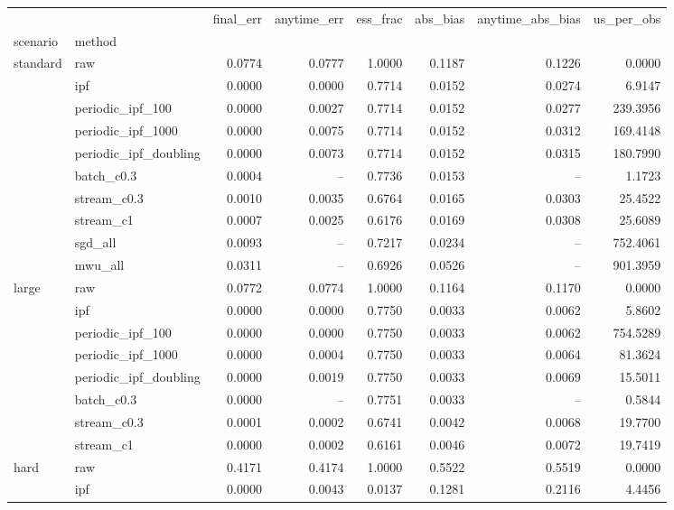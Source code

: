 \begin{tabular}{llrrrrrr}
\toprule
 &  & final\_err & anytime\_err & ess\_frac & abs\_bias & anytime\_abs\_bias & us\_per\_obs \\
scenario & method &  &  &  &  &  &  \\
\midrule
\multirow[t]{10}{*}{standard} & raw & 0.0774 & 0.0777 & 1.0000 & 0.1187 & 0.1226 & 0.0000 \\
 & ipf & 0.0000 & 0.0000 & 0.7714 & 0.0152 & 0.0274 & 6.9147 \\
 & periodic\_ipf\_100 & 0.0000 & 0.0027 & 0.7714 & 0.0152 & 0.0277 & 239.3956 \\
 & periodic\_ipf\_1000 & 0.0000 & 0.0075 & 0.7714 & 0.0152 & 0.0312 & 169.4148 \\
 & periodic\_ipf\_doubling & 0.0000 & 0.0073 & 0.7714 & 0.0152 & 0.0315 & 180.7990 \\
 & batch\_c0.3 & 0.0004 & -- & 0.7736 & 0.0153 & -- & 1.1723 \\
 & stream\_c0.3 & 0.0010 & 0.0035 & 0.6764 & 0.0165 & 0.0303 & 25.4522 \\
 & stream\_c1 & 0.0007 & 0.0025 & 0.6176 & 0.0169 & 0.0308 & 25.6089 \\
 & sgd\_all & 0.0093 & -- & 0.7217 & 0.0234 & -- & 752.4061 \\
 & mwu\_all & 0.0311 & -- & 0.6926 & 0.0526 & -- & 901.3959 \\
\cline{1-8}
\multirow[t]{8}{*}{large} & raw & 0.0772 & 0.0774 & 1.0000 & 0.1164 & 0.1170 & 0.0000 \\
 & ipf & 0.0000 & 0.0000 & 0.7750 & 0.0033 & 0.0062 & 5.8602 \\
 & periodic\_ipf\_100 & 0.0000 & 0.0000 & 0.7750 & 0.0033 & 0.0062 & 754.5289 \\
 & periodic\_ipf\_1000 & 0.0000 & 0.0004 & 0.7750 & 0.0033 & 0.0064 & 81.3624 \\
 & periodic\_ipf\_doubling & 0.0000 & 0.0019 & 0.7750 & 0.0033 & 0.0069 & 15.5011 \\
 & batch\_c0.3 & 0.0000 & -- & 0.7751 & 0.0033 & -- & 0.5844 \\
 & stream\_c0.3 & 0.0001 & 0.0002 & 0.6741 & 0.0042 & 0.0068 & 19.7700 \\
 & stream\_c1 & 0.0000 & 0.0002 & 0.6161 & 0.0046 & 0.0072 & 19.7419 \\
\cline{1-8}
\multirow[t]{10}{*}{hard} & raw & 0.4171 & 0.4174 & 1.0000 & 0.5522 & 0.5519 & 0.0000 \\
 & ipf & 0.0000 & 0.0043 & 0.0137 & 0.1281 & 0.2116 & 4.4456 \\

\end{tabular}
